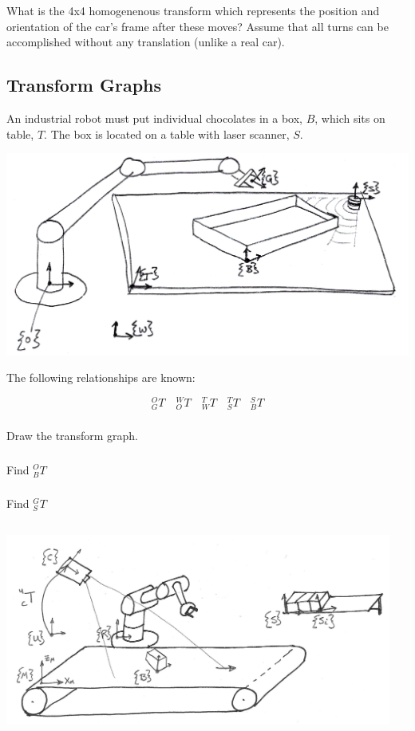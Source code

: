 \documentclass{article}
\begin{document}
What is the 4x4 homogenenous transform which represents the position and orientation of the car's frame after these moves?    Assume that all turns can be accomplished without any translation (unlike a real car).



\subsection{Transform Graphs}
An industrial robot must put individual chocolates in a box, $B$, which sits on table, $T$.   The box is located on a table with laser scanner, $S$.

\includegraphics[width=6.5in]{hw1_543_W13_p6a.png}

The following relationships are known:

\[
{^O_GT}\quad{^W_OT}\quad{^T_WT}\quad{^T_ST}\quad{^S_BT}
\]

\subsubsection{}
Draw the transform graph.

\subsubsection{}
Find ${^O_BT}$

\subsubsection{}
Find ${^G_ST}$



\subsection{}

\includegraphics[width=5.0in]{00575.png}
\end{document}

